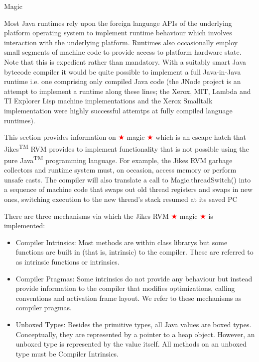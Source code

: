 \begin{chapter}{Magic}
\label{cha:magic}

Most Java runtimes rely upon the foreign language APIs of the underlying platform operating system to implement runtime behaviour which involves interaction with the underlying platform. Runtimes also occasionally employ small segments of machine code to provide access to platform hardware state. Note that this is expedient rather than mandatory. With a suitably smart Java bytecode compiler it would be quite possible to implement a full Java-in-Java runtime i.e. one comprising only compiled Java code (the JNode project is an attempt to implement a runtime along these lines; the Xerox, MIT, Lambda and TI Explorer Lisp machine implementations and the Xerox Smalltalk implementation were highly successful attemtps at fully compiled language runtimes).

This section provides information on \textcolor{red}{$\bigstar$} magic \textcolor{red}{$\bigstar$} which is an escape hatch that Jikes\textsuperscript{TM} RVM provides to implement functionality that is not possible using the pure Java\textsuperscript{TM} programming language. For example, the Jikes RVM garbage collectors and runtime system must, on occasion, access memory or perform unsafe casts. The compiler will also translate a call to Magic.threadSwitch() into a sequence of machine code that swaps out old thread registers and swaps in new ones, switching execution to the new thread's stack resumed at its saved PC

There are three mechanisms via which the Jikes RVM \textcolor{red}{$\bigstar$} magic \textcolor{red}{$\bigstar$} is implemented:
\begin{itemize}
  \item Compiler Intrinsics: Most methods are within class librarys but some functions are built in (that is, intrinsic) to the compiler. These are referred to as intrinsic functions or intrinsics.
  \item Compiler Pragmas: Some intrinsics do not provide any behaviour but instead provide information to the compiler that modifies optimizations, calling conventions and activation frame layout. We refer to these mechanisms as compiler pragmas.
  \item Unboxed Types: Besides the primitive types, all Java values are boxed types. Conceptually, they are represented by a pointer to a heap object. However, an unboxed type is represented by the value itself. All methods on an unboxed type must be Compiler Intrinsics.
\end{itemize}


\end{chapter}
